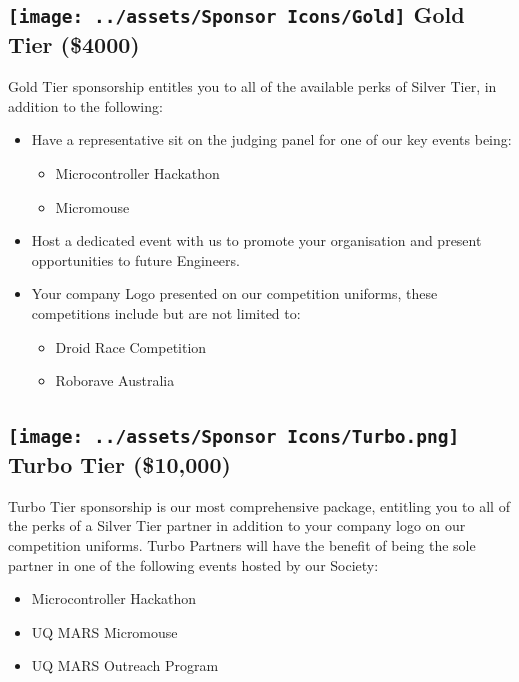 \documentclass[a4paper,12pt]{report}
\begin{document}
\subsection*{
    \texttt{[image: ../assets/Sponsor Icons/Gold]}
    \textcolor{sponsor_gold}{Gold Tier (\$4000)}
}
Gold Tier sponsorship entitles you to all of the available perks of Silver Tier, in addition to the following:
\begin{itemize}
    \item Have a representative sit on the judging panel for one of our key events being:
    
    \begin{itemize}
        \item Microcontroller Hackathon
        \item Micromouse
    \end{itemize}
    
    \item Host a dedicated event with us to promote your organisation and present opportunities to future Engineers.  
    
    \item Your company Logo presented on our competition uniforms, these competitions include but are not limited to: 
    \begin{itemize}
        \item Droid Race Competition
        \item Roborave Australia 
    \end{itemize}
\end{itemize}

\subsection*{
    \texttt{[image: ../assets/Sponsor Icons/Turbo.png]}
    \textcolor{turbo_purple}{Turbo Tier (\$10,000)}
}
Turbo Tier sponsorship is our most comprehensive package, entitling you to all of the perks of a Silver Tier partner in addition to your company logo on our competition uniforms. Turbo Partners will have the benefit of being the sole partner in one of the following events hosted by our Society:
\begin{itemize}
    \item Microcontroller Hackathon 
    \item UQ MARS Micromouse 
    \item UQ MARS Outreach Program 
\end{itemize}
\end{document}
